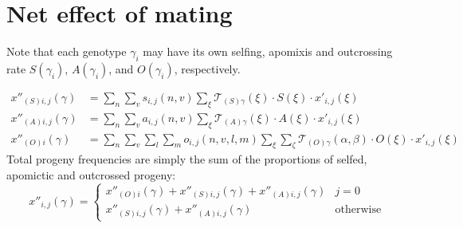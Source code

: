 \documentclass[12pt,twoside,letterpaper,fleqn]{report}
\numberwithin{equation}{section}  %
\newcommand{\K}{{\bf K}}
\newcommand{\Kcode}[1]{{\tt #1}}
\newcommand{\xpijx}{\mbox{$x'_{i,j}(\xi)$}}
\newcommand{\xppsijg}{\mbox{$x''_{(S)i,j}(\gamma)$}}
\newcommand{\xppaijg}{\mbox{$x''_{(A)i,j}(\gamma)$}}
\newcommand{\xppoig}{\mbox{$x''_{(O)i}(\gamma)$}}
\newcommand{\xppoijg}{\xppoig}
\newcommand{\xppijg}{\mbox{$x''_{i,j}(\gamma)$}}
\newcommand{\funcself}{\mbox{$s_{i,j}(n,v)$}}
\newcommand{\funcapomixis}{\mbox{$a_{i,j}(n,v)$}}
\newcommand{\funcoutcross}{\mbox{$o_{i,j}(n,v,l,m)$}}
\newcommand{\TSgx}{\mbox{$\mathcal{T}_{(S)\gamma}(\xi)$}}
\newcommand{\TAgx}{\mbox{$\mathcal{T}_{(A)\gamma}(\xi)$}}
\newcommand{\TOgab}{\mbox{$\mathcal{T}_{(O)\gamma}(\alpha, \beta)$}}
\begin{document}
{%
\section{Net effect of mating}

Note that each genotype $\gamma_i$ may have its own selfing, apomixis and outcrossing rate $S(\gamma_i)$, $A(\gamma_i)$, and $O(\gamma_i)$, respectively.

\begin{align}
\label{eq:Kreproduction:xppsijg}
\xppsijg &= 
    \sum_{n}{
		\sum_{v}{
		    \funcself \sum_{\xi}{\TSgx \cdot S(\xi) \cdot \xpijx}
		}
	}
\\
\label{eq:Kreproduction:xppaijg}
\xppaijg &= 
    \sum_{n}{
		\sum_{v}{
			\funcapomixis \sum_{\xi}{\TAgx \cdot A(\xi) \cdot \xpijx}
		}
	}
\\
\label{eq:Kreproduction:xppoijg}
\xppoijg &= 
    \sum_{n}{
		\sum_{v}{
			\sum_{l}{
				\sum_{m}{
					\funcoutcross 
					\sum_{\xi}{\sum_{\zeta}{\TOgab \cdot O(\xi) \cdot \xpijx}}
				}
			}
		}
	}
\end{align}
Total progeny frequencies are simply the sum of the proportions of selfed, apomictic and outcrossed progeny:
\begin{equation}
\xppijg = 
\begin{cases}
    \xppoig + \xppsijg + \xppaijg  &  j=0               \\
    \xppsijg + \xppaijg            &  \text{otherwise}
\end{cases}
\end{equation}


}
\end{document}
